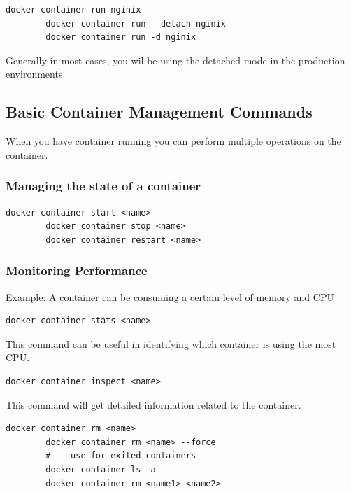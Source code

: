 \documentclass[11pt]{book}
\begin{document}
    \begin{lstlisting}[style=terminal]
        docker container run nginix
        docker container run --detach nginix
        docker container run -d nginix
    \end{lstlisting}

    Generally in most cases, you wil be using the detached mode in the production environments.


    \subsection{Basic Container Management Commands}

    When you have container running you can perform multiple operations on the container.

    \subsubsection{Managing the state of a container}
    \begin{lstlisting}[style=terminal]
        docker container start <name>
        docker container stop <name>
        docker container restart <name>
    \end{lstlisting}

    \subsubsection{Monitoring Performance}
    Example: A container can be consuming a certain level of memory and CPU
    \begin{lstlisting}[style=terminal]
        docker container stats <name>
    \end{lstlisting}

    This command can be useful in identifying which container is using the most CPU.

    \begin{lstlisting}[style=terminal]
        docker container inspect <name>
    \end{lstlisting}

    This command will get detailed information related to the container.

    \begin{lstlisting}[style=terminal]
        docker container rm <name>
        docker container rm <name> --force
        #--- use for exited containers
        docker container ls -a
        docker container rm <name1> <name2>
    \end{lstlisting}
\end{document}
